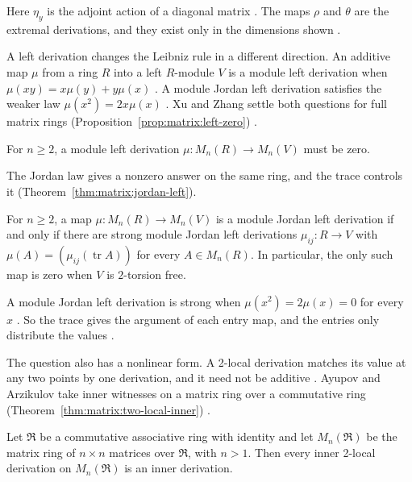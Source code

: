 Here $\eta_y$ is the adjoint action of a diagonal matrix
\cite[p.~379]{OuWangYao2007}. The maps $\rho$ and $\theta$ are the extremal
derivations, and they exist only in the dimensions shown
\cite[pp.~379--380]{OuWangYao2007}.

A left derivation changes the Leibniz rule in a different direction. An additive
map $\mu$ from a ring $R$ into a left $R$-module $V$ is a module left derivation
when $\mu(xy)=x\mu(y)+y\mu(x)$ \cite[p.~753]{XuZhang2010Left}. A module Jordan
left derivation satisfies the weaker law $\mu(x^{2})=2x\mu(x)$
\cite[p.~754]{XuZhang2010Left}. Xu and Zhang settle both questions for full
matrix rings (Proposition~\ref{prop:matrix:left-zero}) \cite[pp.~755--757]{XuZhang2010Left}.

\begin{proposition}\label{prop:matrix:left-zero}
For $n\geq2$, a module left derivation $\mu\colon M_n(R)\to M_n(V)$ must be
zero.
\end{proposition}

The Jordan law gives a nonzero answer on the same ring, and the trace controls
it (Theorem~\ref{thm:matrix:jordan-left}).

\begin{theorem}\label{thm:matrix:jordan-left}
For $n\geq2$, a map $\mu\colon M_n(R)\to M_n(V)$ is a module Jordan left
derivation if and only if there are strong module Jordan left derivations
$\mu_{ij}\colon R\to V$ with $\mu(A)=(\mu_{ij}(\operatorname{tr}A))$ for every
$A\in M_n(R)$. In particular, the only such map is zero when $V$ is $2$-torsion
free.
\end{theorem}

A module Jordan left derivation is strong when $\mu(x^{2})=2\mu(x)=0$ for every
$x$ \cite[p.~754]{XuZhang2010Left}. So the trace gives the argument of each
entry map, and the entries only distribute the values
\cite[pp.~756--757]{XuZhang2010Left}.

The question also has a nonlinear form. A 2-local derivation matches its value at
any two points by one derivation, and it need not be additive
\cite[p.~1]{AyupovArzikulov2013}. Ayupov and Arzikulov take inner witnesses on
a matrix ring over a commutative ring (Theorem~\ref{thm:matrix:two-local-inner})
\cite[Theorem~2.1, p.~2]{AyupovArzikulov2013}.\begin{theorem}\label{thm:matrix:two-local-inner}
Let $\Re$ be a commutative associative ring with identity and let $M_n(\Re)$ be
the matrix ring of $n\times n$ matrices over $\Re$, with $n>1$. Then every inner
2-local derivation on $M_n(\Re)$ is an inner derivation.
\end{theorem}

